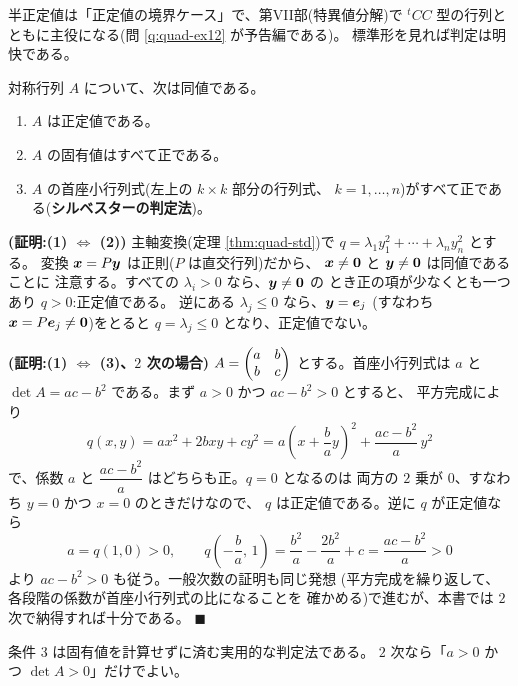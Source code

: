 半正定値は「正定値の境界ケース」で、第VII部(特異値分解)で
${}^t\!CC$ 型の行列とともに主役になる(問 \ref{q:quad-ex12} が予告編である)。
標準形を見れば判定は明快である。

\begin{teiri}[正定値性の判定]\label{thm:quad-criteria}
対称行列 $A$ について、次は同値である。
\begin{enumerate}
\item $A$ は正定値である。
\item $A$ の固有値はすべて正である。
\item $A$ の首座小行列式(左上の $k \times k$ 部分の行列式、
$k = 1, \dots, n$)がすべて正である(\textbf{シルベスターの判定法})。
\end{enumerate}
\end{teiri}

\noindent\textbf{(証明:(1) $\iff$ (2))}\quad
主軸変換(定理 \ref{thm:quad-std})で
$q = \lambda_1y_1^2 + \cdots + \lambda_ny_n^2$ とする。
変換 $\bm{x} = P\bm{y}$ は正則($P$ は直交行列)だから、
$\bm{x} \neq \bm{0}$ と $\bm{y} \neq \bm{0}$ は同値であることに
注意する。すべての $\lambda_i > 0$ なら、$\bm{y} \neq \bm{0}$ の
とき正の項が少なくとも一つあり $q > 0$:正定値である。
逆にある $\lambda_j \le 0$ なら、$\bm{y} = \bm{e}_j$
(すなわち $\bm{x} = P\bm{e}_j \neq \bm{0}$)をとると
$q = \lambda_j \le 0$ となり、正定値でない。

\noindent\textbf{(証明:(1) $\iff$ (3)、$2$ 次の場合)}\quad
$A = \begin{pmatrix}a & b \\ b & c\end{pmatrix}$ とする。首座小行列式は $a$ と
$\det A = ac - b^2$ である。まず $a > 0$ かつ $ac - b^2 > 0$ とすると、
平方完成により
\[
q(x, y) = ax^2 + 2bxy + cy^2
= a\left(x + \frac{b}{a}y\right)^2 + \frac{ac - b^2}{a}\,y^2
\]
で、係数 $a$ と $\dfrac{ac - b^2}{a}$ はどちらも正。$q = 0$ となるのは
両方の $2$ 乗が $0$、すなわち $y = 0$ かつ $x = 0$ のときだけなので、
$q$ は正定値である。逆に $q$ が正定値なら
\[
a = q(1, 0) > 0, \qquad
q\left(-\frac{b}{a},\, 1\right) = \frac{b^2}{a} - \frac{2b^2}{a} + c
= \frac{ac - b^2}{a} > 0
\]
より $ac - b^2 > 0$ も従う。一般次数の証明も同じ発想
(平方完成を繰り返して、各段階の係数が首座小行列式の比になることを
確かめる)で進むが、本書では $2$ 次で納得すれば十分である。
$\blacksquare$

条件 3 は固有値を計算せずに済む実用的な判定法である。
$2$ 次なら「$a > 0$ かつ $\det A > 0$」だけでよい。

